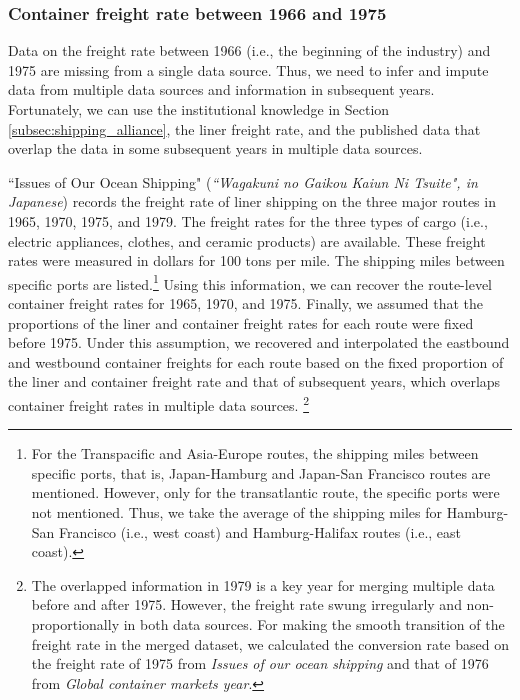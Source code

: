 \subsubsection{Container freight rate between 1966 and 1975}



Data on the freight rate between 1966 (i.e., the beginning of the industry) and 1975 are missing from a single data source. Thus, we need to infer and impute data from multiple data sources and information in subsequent years. Fortunately, we can use the institutional knowledge in Section  \ref{subsec:shipping_alliance}, the liner freight rate, and the published data that overlap the data in some subsequent years in multiple data sources.

``Issues of Our Ocean Shipping" (\textit{``Wagakuni no Gaikou Kaiun Ni Tsuite", in Japanese}) records the freight rate of liner shipping on the three major routes in 1965, 1970, 1975, and 1979. The freight rates for the three types of cargo (i.e., electric appliances, clothes, and ceramic products) are available. These freight rates were measured in dollars for 100 tons per mile. The shipping miles between specific ports are listed.\footnote{For the Transpacific and Asia-Europe routes, the shipping miles between specific ports, that is, Japan-Hamburg and Japan-San Francisco routes are mentioned. However, only for the transatlantic route, the specific ports were not mentioned. Thus, we take the average of the shipping miles for Hamburg-San Francisco (i.e., west coast) and Hamburg-Halifax routes (i.e., east coast).} Using this information, we can recover the route-level container freight rates for 1965, 1970, and 1975. Finally, we assumed that the proportions of the liner and container freight rates for each route were fixed before 1975. Under this assumption, we recovered and interpolated the eastbound and westbound container freights for each route based on the fixed proportion of the liner and container freight rate and that of subsequent years, which overlaps container freight rates in multiple data sources. \footnote{The overlapped information in 1979 is a key year for merging multiple data before and after 1975. However, the freight rate swung irregularly and non-proportionally in both data sources. For making the smooth transition of the freight rate in the merged dataset, we calculated the conversion rate based on the freight rate of 1975 from \textit{Issues of our ocean shipping} and that of 1976 from \textit{Global container markets year}.}



